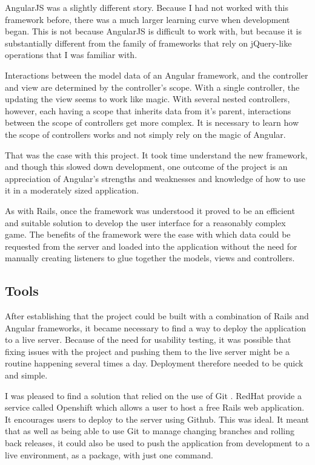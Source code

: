 AngularJS was a slightly different story. Because I had not worked with this framework before, there was a much larger learning curve when development began. This is not because AngularJS is difficult to work with, but because it is substantially different from the family of frameworks that rely on jQuery-like operations that I was familiar with.

Interactions between the model data of an Angular framework, and the controller and view are determined by the controller's scope. With a single controller, the updating the view seems to work like magic. With several nested controllers, however, each having a scope that inherits data from it's parent, interactions between the scope of controllers get more complex. It is necessary to learn how the scope of controllers works and not simply rely on the magic of Angular. 

That was the case with this project. It took time understand the new framework, and though this slowed down development, one outcome of the project is an appreciation of Angular's strengths and weaknesses and knowledge of how to use it in a moderately sized application. 

As with Rails, once the framework was understood it proved to be an efficient and suitable solution to develop the user interface for a reasonably complex game. The benefits of the framework were the ease with which data could be requested from the server and loaded into the application without the need for manually creating listeners to glue together the models, views and controllers.

\subsection{Tools}
After establishing that the project could be built with a combination of Rails and Angular frameworks, it became necessary to find a way to deploy the application to a live server. Because of the need for usability testing, it was possible that fixing issues with the project and pushing them to the live server might be a routine happening several times a day. Deployment therefore needed to be quick and simple.

I was pleased to find a solution that relied on the use of Git \cite{Git}. RedHat provide a service called Openshift \cite{OpenShift} which allows a user to host a free Rails web application. It encourages users to deploy to the server using Github. This was ideal. It meant that as well as being able to use Git to manage changing branches and rolling back releases, it could also be used to push the application from development to a live environment, as a package, with just one command.

